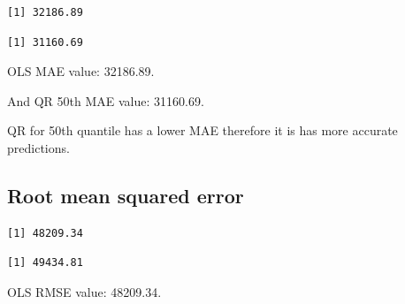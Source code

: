 \documentclass[
  letterpaper,
  DIV=11,
  numbers=noendperiod]{scrreprt}
\newenvironment{Shaded}{\begin{snugshade}}{\end{snugshade}}
\newcommand{\FunctionTok}[1]{\textcolor[rgb]{0.28,0.35,0.67}{#1}}
\newcommand{\NormalTok}[1]{\textcolor[rgb]{0.00,0.23,0.31}{#1}}
\newcommand{\OtherTok}[1]{\textcolor[rgb]{0.00,0.23,0.31}{#1}}
\newcommand{\SpecialCharTok}[1]{\textcolor[rgb]{0.37,0.37,0.37}{#1}}
\begin{document}
\begin{verbatim}
[1] 32186.89
\end{verbatim}

\begin{Shaded}
\end{Shaded}

\begin{verbatim}
[1] 31160.69
\end{verbatim}

OLS MAE value: 32186.89.

And QR 50th MAE value: 31160.69.

QR for 50th quantile has a lower MAE therefore it is has more accurate
predictions.

\hypertarget{root-mean-squared-error-1}{%
\subsection{Root mean squared error}\label{root-mean-squared-error-1}}

\begin{Shaded}
\end{Shaded}

\begin{verbatim}
[1] 48209.34
\end{verbatim}

\begin{Shaded}
\end{Shaded}

\begin{verbatim}
[1] 49434.81
\end{verbatim}

OLS RMSE value: 48209.34.
\end{document}
